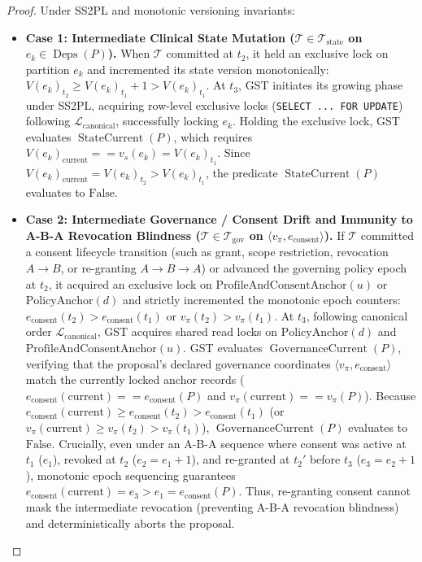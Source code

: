 \documentclass[11pt]{article}
\begin{document}
\begin{proof}
Under SS2PL and monotonic versioning invariants:
\begin{itemize}
    \item \textbf{Case 1: Intermediate Clinical State Mutation ($\mathcal{T} \in \mathcal{T}_{\text{state}}$ on $e_k \in \operatorname{Deps}(P)$).}
    When $\mathcal{T}$ committed at $t_2$, it held an exclusive lock on partition $e_k$ and incremented its state version monotonically: $V(e_k)_{t_2} \ge V(e_k)_{t_1} + 1 > V(e_k)_{t_1}$.
    At $t_3$, GST initiates its growing phase under SS2PL, acquiring row-level exclusive locks (\texttt{SELECT ... FOR UPDATE}) following $\mathcal{L}_{\text{canonical}}$, successfully locking $e_k$.
    Holding the exclusive lock, GST evaluates $\operatorname{StateCurrent}(P)$, which requires $V(e_k)_{\text{current}} == v_s(e_k) = V(e_k)_{t_1}$.
    Since $V(e_k)_{\text{current}} = V(e_k)_{t_2} > V(e_k)_{t_1}$, the predicate $\operatorname{StateCurrent}(P)$ evaluates to $\text{False}$.

    \item \textbf{Case 2: Intermediate Governance / Consent Drift and Immunity to A-B-A Revocation Blindness ($\mathcal{T} \in \mathcal{T}_{\text{gov}}$ on $\langle v_{\pi}, e_{\text{consent}} \rangle$).}
    If $\mathcal{T}$ committed a consent lifecycle transition (such as grant, scope restriction, revocation $A \to B$, or re-granting $A \to B \to A$) or advanced the governing policy epoch at $t_2$, it acquired an exclusive lock on $\text{ProfileAndConsentAnchor}(u)$ or $\text{PolicyAnchor}(d)$ and strictly incremented the monotonic epoch counters: $e_{\text{consent}}(t_2) > e_{\text{consent}}(t_1)$ or $v_{\pi}(t_2) > v_{\pi}(t_1)$.
    At $t_3$, following canonical order $\mathcal{L}_{\text{canonical}}$, GST acquires shared read locks on $\text{PolicyAnchor}(d)$ and $\text{ProfileAndConsentAnchor}(u)$.
    GST evaluates $\operatorname{GovernanceCurrent}(P)$, verifying that the proposal's declared governance coordinates $\langle v_{\pi}, e_{\text{consent}} \rangle$ match the currently locked anchor records ($e_{\text{consent}}(\text{current}) == e_{\text{consent}}(P)$ and $v_{\pi}(\text{current}) == v_{\pi}(P)$).
    Because $e_{\text{consent}}(\text{current}) \ge e_{\text{consent}}(t_2) > e_{\text{consent}}(t_1)$ (or $v_{\pi}(\text{current}) \ge v_{\pi}(t_2) > v_{\pi}(t_1)$), $\operatorname{GovernanceCurrent}(P)$ evaluates to $\text{False}$.
    Crucially, even under an A-B-A sequence where consent was active at $t_1$ ($e_1$), revoked at $t_2$ ($e_2 = e_1 + 1$), and re-granted at $t_2'$ before $t_3$ ($e_3 = e_2 + 1$), monotonic epoch sequencing guarantees $e_{\text{consent}}(\text{current}) = e_3 > e_1 = e_{\text{consent}}(P)$. Thus, re-granting consent cannot mask the intermediate revocation (preventing A-B-A revocation blindness) and deterministically aborts the proposal.


\end{itemize}
\end{proof}
\end{document}
